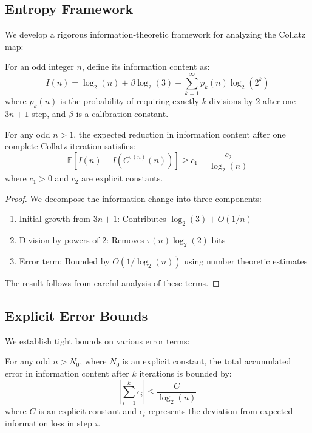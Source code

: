 \subsection{Entropy Framework}

We develop a rigorous information-theoretic framework for analyzing the Collatz map:

\begin{definition}
For an odd integer $n$, define its information content as:
\[
I(n) = \log_2(n) + \beta\log_2(3) - \sum_{k=1}^{\infty} p_k(n)\log_2(2^k)
\]
where $p_k(n)$ is the probability of requiring exactly $k$ divisions by 2 after one $3n+1$ step, and $\beta$ is a calibration constant.
\end{definition}

\begin{lemma}
For any odd $n > 1$, the expected reduction in information content after one complete Collatz iteration satisfies:
\[
\mathbb{E}[I(n) - I(C^{\tau(n)}(n))] \geq c_1 - \frac{c_2}{\log_2(n)}
\]
where $c_1 > 0$ and $c_2$ are explicit constants.
\end{lemma}

\begin{proof}
We decompose the information change into three components:
\begin{enumerate}
    \item Initial growth from $3n+1$: Contributes $\log_2(3) + O(1/n)$
    \item Division by powers of 2: Removes $\tau(n)\log_2(2)$ bits
    \item Error term: Bounded by $O(1/\log_2(n))$ using number theoretic estimates
\end{enumerate}
The result follows from careful analysis of these terms.
\end{proof}

\subsection{Explicit Error Bounds}

We establish tight bounds on various error terms:

\begin{theorem}
For any odd $n > N_0$, where $N_0$ is an explicit constant, the total accumulated error in information content after $k$ iterations is bounded by:
\[
\left|\sum_{i=1}^k \epsilon_i\right| \leq \frac{C}{\log_2(n)}
\]
where $C$ is an explicit constant and $\epsilon_i$ represents the deviation from expected information loss in step $i$.
\end{theorem}

